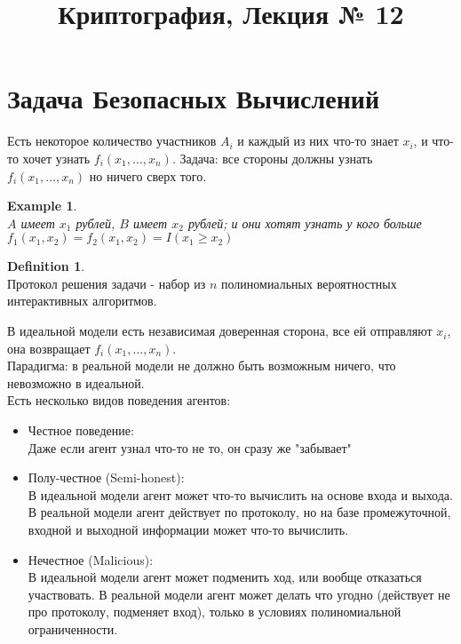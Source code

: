 \documentclass[a4paper]{article}
\title{Криптография, Лекция № 12}
\theoremstyle{definition}
\newtheorem{definition}{Definition}
\theoremstyle{plain}
\newtheorem{example}{Example}
\begin{document}
\maketitle

\section{Задача Безопасных Вычислений}

Есть некоторое количество участников $A_i$ и каждый из них что-то знает $x_i$,
и что-то хочет узнать $f_i(x_1, \ldots, x_n)$. Задача: все стороны должны узнать
$f_i(x_1, \ldots, x_n)$ но ничего сверх того.

\begin{example}~\\
	$A$ имеет $x_1$ рублей,
	$B$ имеет $x_2$ рублей;
	и они хотят узнать у кого больше $f_1(x_1, x_2) = f_2(x_1, x_2) = I(x_1 \ge x_2)$
\end{example}

\begin{definition}~\\
	Протокол решения задачи - набор из $n$ полиномиальных вероятностных
	интерактивных алгоритмов.
\end{definition}

\noindent В идеальной модели есть независимая доверенная сторона, все ей отправляют $x_i$,
она возвращает $f_i(x_1, \ldots, x_n)$.~\\

\noindent Парадигма: в реальной модели не должно быть возможным ничего, что
невозможно в идеальной.~\\

\noindent Есть несколько видов поведения агентов:
\begin{itemize}
	\item Честное поведение:~\\
		Даже если агент узнал что-то не то, он сразу же "забывает"
	\item Полу-честное (Semi-honest):~\\
		В идеальной модели агент может что-то вычислить на основе входа и выхода.
		В реальной модели агент действует по протоколу, но на базе промежуточной,
		входной и выходной информации может что-то вычислить.
	\item Нечестное (Malicious):~\\
		В идеальной модели агент может подменить ход, или вообще отказаться участвовать.
		В реальной модели агент может делать что угодно (действует не про протоколу,
		подменяет вход), только в условиях полиномиальной ограниченности.
\end{itemize}
\end{document}
